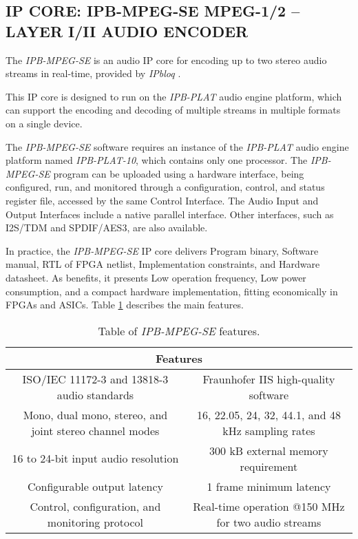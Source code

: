 \subsection{IP CORE: IPB-MPEG-SE MPEG-1/2 – LAYER I/II AUDIO ENCODER}

The \textit{IPB-MPEG-SE} \cite{ipb-mpeg-se} is an audio IP core for encoding up to two stereo audio streams in real-time, provided by \textit{IPbloq} \cite{ipbloq}.

This IP core is designed to run on the \textit{IPB-PLAT} audio engine platform, which can support the encoding and decoding of multiple streams in multiple formats on a single device.

The \textit{IPB-MPEG-SE} software requires an instance of the \textit{IPB-PLAT} audio engine platform named \textit{IPB-PLAT-10}, which contains only one processor. 
The \textit{IPB-MPEG-SE} program can be uploaded using a hardware interface, being configured, run, and monitored through a configuration, control, and status register file, accessed by the same Control Interface.
The Audio Input and Output Interfaces include a native parallel interface. Other interfaces, such as I2S/TDM and SPDIF/AES3, are also available.

In practice, the \textit{IPB-MPEG-SE} IP core delivers Program binary, Software manual, RTL of FPGA netlist, Implementation constraints, and Hardware datasheet.
As benefits, it presents Low operation frequency, Low power consumption, and a compact hardware implementation, fitting economically in FPGAs and ASICs.
Table \ref{ipbloq} describes the main features.

\begin{table}[h]
    \centering
    \begin{tabular}{|c|c|}
        \hline
        \multicolumn{2}{|c|}{\textbf{Features}} \\
        \hline
         ISO/IEC 11172-3 and 13818-3 audio standards & Fraunhofer IIS high-quality software \\
         \hline
         Mono, dual mono, stereo, and joint stereo channel modes & 16, 22.05, 24, 32, 44.1, and 48 kHz sampling rates \\
         \hline
         16 to 24-bit input audio resolution & 300 kB external memory requirement\\
         \hline
         Configurable output latency & 1 frame minimum latency\\
         \hline
         Control, configuration, and monitoring protocol & Real-time operation @150 MHz for two audio streams\\
         \hline
    \end{tabular}
    \caption{Table of \textit{IPB-MPEG-SE} features.}
    \label{ipbloq}
\end{table}

